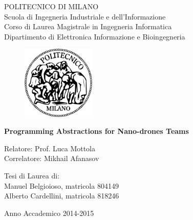 \thispagestyle{empty}
\vspace*{-1.5cm} \bfseries{
\begin{center}
  \large
  POLITECNICO DI MILANO\\
  \normalsize
  Scuola di Ingegneria Industriale e dell'Informazione
  \\
  Corso di Laurea Magistrale in Ingegneria Informatica
  \\
  Dipartimento di Elettronica Informazione e Bioingegneria
  \\
  \vspace{5mm}
  \begin{figure}[htbp]
    \begin{center}
    \includegraphics[width=3.5cm]{pictures/logopm.png}
    \end{center}
  \end{figure}
  \vspace*{0.3cm} \LARGE



  \textbf{Programming Abstractions for Nano-drones Teams}\\



  \vspace*{.75truecm} \large
\end{center}
\vspace*{3.0cm} \large
\begin{flushleft}


  Relatore: Prof. Luca Mottola \\
  Correlatore:  Mikhail Afanasov\\


\end{flushleft}
\vspace*{1.0cm}
\begin{flushright}


  Tesi di Laurea di:\\ Manuel Belgioioso, matricola 804149 \\ 
		       Alberto Cardellini, matricola 818246  \\


\end{flushright}
\vspace*{0.5cm}
\begin{center}



  Anno Accademico 2014-2015
\end{center} \clearpage
}